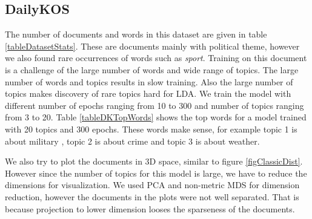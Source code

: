 \documentclass[twoside,12pt]{article}
\begin{document}
\subsection{DailyKOS}
The number of documents and words in this dataset are given in table \ref{tableDatasetStats}. These are  documents mainly with political theme, however we also found rare occurrences of words such as \emph{sport}. Training on this document is a challenge of the large number of words and wide range of topics. The large number of words and topics results in slow training. Also the large number of topics makes discovery of rare topics hard for LDA. We train the model with different number of epochs ranging from 10 to 300 and number of topics ranging from 3 to 20. Table \ref{tableDKTopWords} shows the 
top words for a model trained with 20 topics and 300 epochs. These words make sense, for example topic 1 is about military , topic 2 is about crime and topic 3 is about weather.

We also try to plot the documents in 3D space, similar to figure \ref{figClassicDist}. However since the number of topics for this model is large, we have to reduce the dimensions for visualization. We used PCA and non-metric MDS for dimension reduction, however the documents in the plots were not well separated. That is because projection to lower dimension looses the sparseness of the documents.
\end{document}
